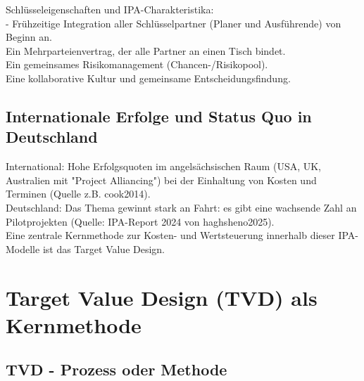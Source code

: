 Schlüsseleigenschaften und IPA-Charakteristika:\\
- Frühzeitige Integration aller Schlüsselpartner (Planer und Ausführende) von Beginn an.\\
Ein Mehrparteienvertrag, der alle Partner an einen Tisch bindet.\\
Ein gemeinsames Risikomanagement (Chancen-/Risikopool).\\
Eine kollaborative Kultur und gemeinsame Entscheidungsfindung.\\


\subsection{Internationale Erfolge und Status Quo in Deutschland}
\label{sec:2.2.3}



International: Hohe Erfolgsquoten im angelsächsischen Raum (USA, UK, Australien mit "Project Alliancing") bei der Einhaltung von Kosten und Terminen (Quelle z.B. cook2014).\\

Deutschland: Das Thema gewinnt stark an Fahrt: es gibt eine wachsende Zahl an Pilotprojekten (Quelle: IPA-Report 2024 von haghsheno2025).\\

Eine zentrale Kernmethode zur Kosten- und Wertsteuerung innerhalb dieser IPA-Modelle ist das Target Value Design.\\
\clearpage

\section{Target Value Design (TVD) als Kernmethode}
\label{sec: 2.3}


\subsection{TVD - Prozess oder Methode}
\label{sec: 2.3.1}

